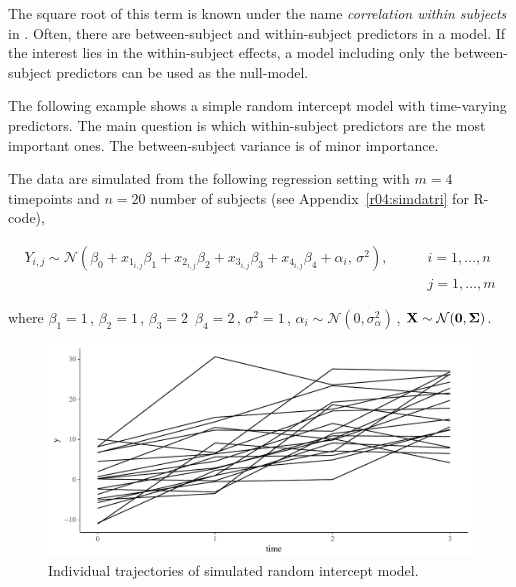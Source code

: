 \documentclass[11pt,a4paper,twoside]{book}\usepackage[]{graphicx}\usepackage[]{color}
\newenvironment{knitrout}{}{} %
\begin{document}
The square root of this term is known under the name \textit{correlation within subjects} in \cite{Bland1995}. Often, there are between-subject and within-subject predictors in a model. If the interest lies in the within-subject effects,  a model including only the between-subject predictors can be used as the null-model.

The following example shows a simple random intercept model with time-varying predictors. The main question is which within-subject predictors are the most important ones. The between-subject variance is of minor importance. 

The data are simulated from the following regression setting with $m = 4$ timepoints and $n = 20$ number of subjects (see Appendix~\ref{r04:simdatri} for R-code),

\begin{align*} 
Y_{i,j} \sim \mathcal{N}(\beta_{0}+x_{1_{i,j}} \beta_{1}+x_{2_{i,j}} \beta_{2}+x_{3_{i,j}} \beta_{3}+x_{4_{i,j}} \beta_{4} + \alpha_{i}, \, \sigma^2), \qquad &i = 1, \dots, n \\  &j = 1, \dots, m
\end{align*} 

where $\beta_{1} = 1 \,$,  $\beta_{2} = 1 \,$,   $\beta_{3} = 2 \,$  $\beta_{4}=2 \,$, $\sigma^2 = 1 \, $, $\alpha_{i} \sim \mathcal{N}(0, \sigma_{\alpha}^2) \,$, ${\mathbf{X}} \sim \mathcal{N}({\mathbf{0}}, {\boldsymbol{\Sigma}}{})$.



\begin{knitrout}
\color{fgcolor}\begin{figure}

{\centering \includegraphics[width=\textwidth-3cm]{figure/ch04_fig_repeated_plot_ri-1} 

}

\caption[Individual trajectories of simulated random intercept model]{Individual trajectories of simulated random intercept model.}\label{fig:.repeated.plot.ri}
\end{figure}


\end{knitrout}
\end{document}
